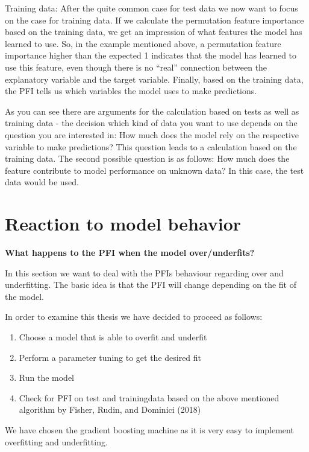 \documentclass[
]{krantz}
\begin{document}
Training data:
After the quite common case for test data we now want to focus on the case for training data. If we calculate the permutation feature importance based on the training data, we get an impression of what features the model has learned to use. So, in the example mentioned above, a permutation feature importance higher than the expected 1 indicates that the model has learned to use this feature, even though there is no ``real'' connection between the explanatory variable and the target variable. Finally, based on the training data, the PFI tells us which variables the model uses to make predictions.

As you can see there are arguments for the calculation based on tests as well as training data - the decision which kind of data you want to use depends on the question you are interested in: How much does the model rely on the respective variable to make predictions? This question leads to a calculation based on the training data. The second possible question is as follows: How much does the feature contribute to model performance on unknown data? In this case, the test data would be used.

\hypertarget{reaction-to-model-behavior}{%
\section{Reaction to model behavior}\label{reaction-to-model-behavior}}

\textbf{What happens to the PFI when the model over/underfits?}

In this section we want to deal with the PFIs behaviour regarding over and underfitting. The basic idea is that the PFI will change depending on the fit of the model.

In order to examine this thesis we have decided to proceed as follows:

\begin{enumerate}
\def\labelenumi{\arabic{enumi}.}
\item
  Choose a model that is able to overfit and underfit
\item
  Perform a parameter tuning to get the desired fit
\item
  Run the model
\item
  Check for PFI on test and trainingdata based on the above mentioned algorithm by Fisher, Rudin, and Dominici (2018)
\end{enumerate}

We have chosen the gradient boosting machine as it is very easy to implement overfitting and underfitting.
\end{document}
